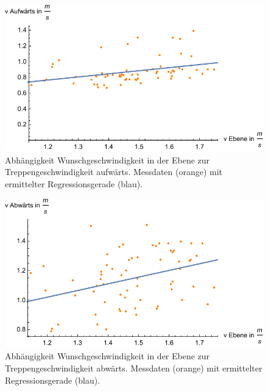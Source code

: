 \begin{figure} \centering 
	\includegraphics[]{abbildungen/regression/2017/auf-ebene.pdf}
	
	\caption{Abhängigkeit Wunschgeschwindigkeit in der Ebene zur Treppengeschwindigkeit aufwärts. Messdaten (orange) mit ermittelter Regressionsgerade (blau). \label{fig:auf2017-ebene}}
\end{figure}

\begin{figure} \centering 
	\includegraphics[]{abbildungen/regression/2017/ab-ebene.pdf}
	
	\caption{Abhängigkeit Wunschgeschwindigkeit in der Ebene zur Treppengeschwindigkeit abwärts. Messdaten (orange) mit ermittelter Regressionsgerade (blau). \label{fig:ab2017-ebene}}
\end{figure}


